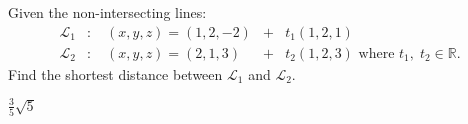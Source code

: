 
\begin{Exercise}[
name={},
title={}, 
difficulty=0,
origin={\cite{BS}}]
Given the non-intersecting lines:
\[
\begin{array}{lllllllll}
\mathcal{L}_1 & : & \; (x, y, z)=(1, 2, -2) & + & t_1(1, 2, 1)\\
\mathcal{L}_2 & : & \; (x, y, z)=(2, 1, 3) & + & t_2(1, 2, 3) \text{ where $t_1,\;t_2\in\mathbb{R}$.}
\end{array}
\] Find the shortest distance between $\mathcal{L}_1$ and $\mathcal{L}_2$.
\end{Exercise}
\begin{Answer}
$\frac{3}{5}\sqrt{5}$
\end{Answer}
